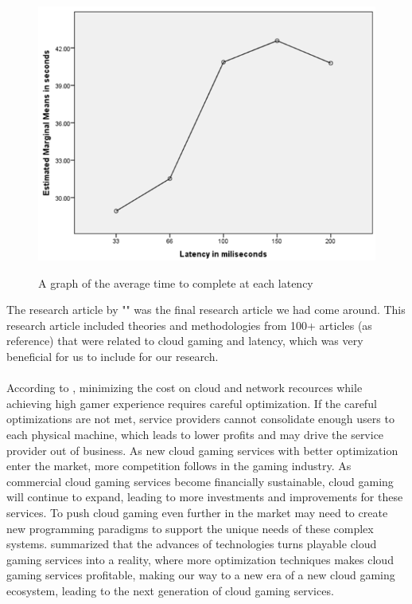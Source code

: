 \begin{figure}[H]
	\centering
	\includegraphics[width=12cm]{../img/fig25.png}
	\caption{A graph of the average time to complete at each latency}
	\parencite[Chapter 4.1, Page 15, Figure 4.1]{claypool2014effects}
\end{figure}
\newpage
The research article  by "\citeauthor{7536162}" was the final research article we had come around. This research article included theories and methodologies from 100+ articles (as reference) that were related to cloud gaming and latency, which was very beneficial for us to include for our research.\\\\
According to \textcite[Chapter VI]{7536162}, minimizing the cost on cloud and network recources while achieving high gamer experience requires careful optimization. If the careful optimizations are not met, service providers cannot consolidate enough users to each physical machine, which leads to lower profits and may drive the service provider out of business. As new cloud gaming services with better optimization enter the market, more competition follows in the gaming industry. As commercial cloud gaming services become financially sustainable, cloud gaming will continue to expand, leading to more investments and improvements for these services. To push cloud gaming even further in the market may need to create new programming paradigms to support the unique needs of these complex systems. \textcite[Chapter VI]{7536162} summarized that the advances of technologies turns playable cloud gaming services into a reality, where more optimization techniques makes cloud gaming services profitable, making our way to a new era of a new cloud gaming ecosystem, leading to the next generation of cloud gaming services.